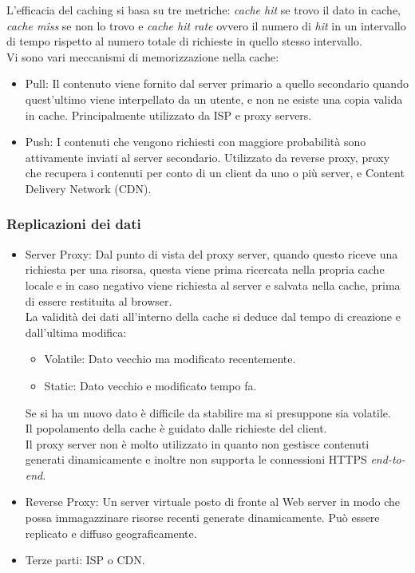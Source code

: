 \documentclass{article}
\begin{document}
		L'efficacia del caching si basa su tre metriche: \textit{cache hit} se trovo il dato in cache, \textit{cache miss} se non lo trovo e \textit{cache hit rate} ovvero il numero di \textit{hit} in un intervallo di tempo rispetto al numero totale di richieste in quello stesso intervallo.\\
		
		Vi sono vari meccanismi di memorizzazione nella cache:
		\begin{itemize}
		    \item Pull: Il contenuto viene fornito dal server primario a quello secondario quando quest'ultimo viene interpellato da un utente, e non ne esiste una copia valida in cache. Principalmente utilizzato da ISP e proxy servers.
		    \item Push: I contenuti che vengono richiesti con maggiore probabilità sono attivamente inviati al server secondario. Utilizzato da reverse proxy, proxy che recupera i contenuti per conto di un client da uno o più server, e Content Delivery Network (CDN).
		\end{itemize}
		
		\subsubsection{Replicazioni dei dati}
		\begin{itemize}
		    \item Server Proxy: Dal punto di vista del proxy server, quando questo riceve una richiesta per una risorsa, questa viene prima ricercata nella propria cache locale e in caso negativo viene richiesta al server e salvata nella cache, prima di essere restituita al browser.\\
		    La validità dei dati all'interno della cache si deduce dal tempo di creazione e dall'ultima modifica:
		    \begin{itemize}
		        \item Volatile: Dato vecchio ma modificato recentemente.
		        \item Static: Dato vecchio e modificato tempo fa.
		    \end{itemize}
		    Se si ha un nuovo dato è difficile da stabilire ma si presuppone sia volatile.\\
		    Il popolamento della cache è guidato dalle richieste del client.\\
		    Il proxy server non è molto utilizzato in quanto non gestisce contenuti generati dinamicamente e inoltre non supporta le connessioni HTTPS \textit{end-to-end}.
		    \item Reverse Proxy: Un server virtuale posto di fronte al Web server in modo che possa immagazzinare risorse recenti generate dinamicamente. Può essere replicato e diffuso geograficamente.
		    \item Terze parti: ISP o CDN.
		\end{itemize}
		
\end{document}
